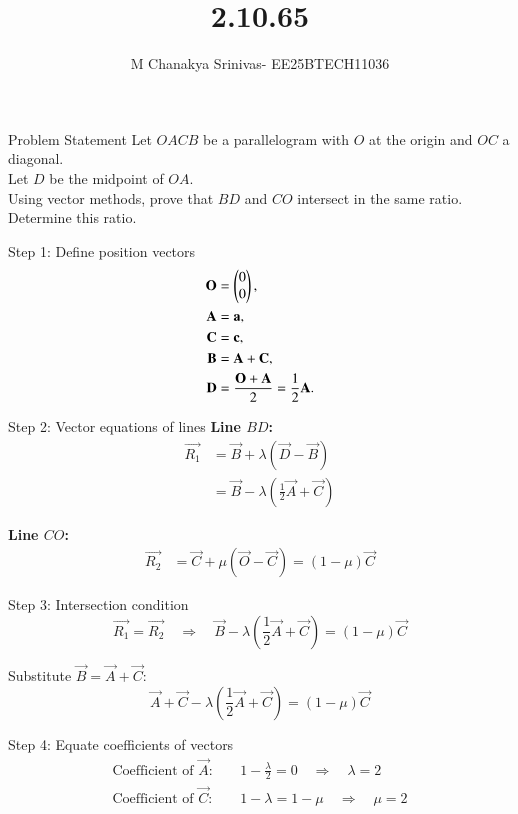 \documentclass{beamer}
\title %
{2.10.65}
\date{}
\author %
{M Chanakya Srinivas- EE25BTECH11036}
\begin{document}
\frame{\titlepage}






\begin{frame}{Problem Statement}
Let \(OACB\) be a parallelogram with \(O\) at the origin and \(OC\) a diagonal.\\
Let \(D\) be the midpoint of \(OA\).\\
Using vector methods, prove that \(BD\) and \(CO\) intersect in the same ratio. Determine this ratio.
\end{frame}

\begin{frame}{Step 1: Define position vectors}
\begin{align}
\mathbf{O} &= \begin{pmatrix}0\\0\end{pmatrix}, \\
\mathbf{A} &= \mathbf{a}, \\
\mathbf{C} &= \mathbf{c}, \\
\mathbf{B} &= \mathbf{A} + \mathbf{C}, \\
\mathbf{D} &= \frac{\mathbf{O} + \mathbf{A}}{2} = \frac{1}{2}\mathbf{A}.
\end{align}
\end{frame}

\begin{frame}{Step 2: Vector equations of lines}
\textbf{Line \(BD\):}
\begin{align}
\vec{R_1} &= \vec{B} + \lambda (\vec{D} - \vec{B}) \\
&= \vec{B} - \lambda \left(\frac{1}{2}\vec{A} + \vec{C}\right)
\end{align}

\textbf{Line \(CO\):}
\begin{align}
\vec{R_2} &= \vec{C} + \mu (\vec{O} - \vec{C}) = (1-\mu)\vec{C}
\end{align}
\end{frame}

\begin{frame}{Step 3: Intersection condition}
\[
\vec{R_1} = \vec{R_2} \quad \Rightarrow \quad 
\vec{B} - \lambda \left(\frac{1}{2}\vec{A} + \vec{C}\right) = (1-\mu)\vec{C}
\]

Substitute \(\vec{B} = \vec{A} + \vec{C}\):
\[
\vec{A} + \vec{C} - \lambda \left(\frac{1}{2}\vec{A} + \vec{C}\right) = (1-\mu)\vec{C}
\]
\end{frame}

\begin{frame}{Step 4: Equate coefficients of vectors}
\begin{align}
\text{Coefficient of } \vec{A}: & \quad 1 - \frac{\lambda}{2} = 0 \quad \Rightarrow \quad \lambda = 2 \\
\text{Coefficient of } \vec{C}: & \quad 1 - \lambda = 1 - \mu \quad \Rightarrow \quad \mu = 2
\end{align}
\end{frame}
\end{document}

